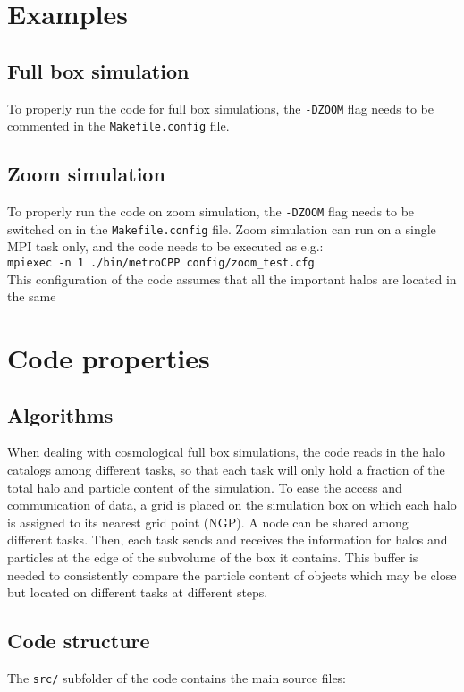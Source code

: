 \documentclass{article}
\begin{document}
\section{Examples}

\subsection{Full box simulation}
To properly run the code for full box simulations, the \texttt{-DZOOM} flag needs to be commented in the \texttt{Makefile.config} file.



\subsection{Zoom simulation}
To properly run the code on zoom simulation, the \texttt{-DZOOM} flag needs to be switched on in the \texttt{Makefile.config} file.
Zoom simulation can run on a single MPI task only, and the code needs to be executed as e.g.:\\

\texttt{mpiexec -n 1 ./bin/metroCPP config/zoom\_test.cfg}\\

This configuration of the code assumes that all the important halos are located in the same 

\section{Code properties}
\label{sec:advanced}


\subsection{Algorithms}
When dealing with cosmological full box simulations, the code reads in the halo catalogs among different tasks, so that
each task will only hold a fraction of the total halo and particle content of the simulation.
To ease the access and communication of data, a grid is placed on the simulation box on which each halo is assigned to its
nearest grid point (NGP). A node can be shared among different tasks.
Then, each task sends and receives the information for halos and particles at the edge of the subvolume of the box it contains. 
This buffer is needed to consistently compare the particle content of objects which may be close but located on different 
tasks at different steps. 


\subsection{Code structure}
The \texttt{src/} subfolder of the code contains the main source files:
\end{document}
